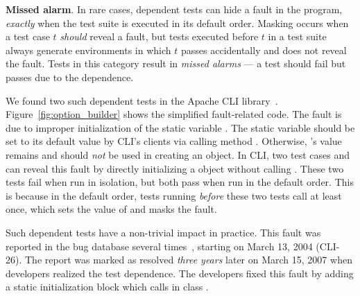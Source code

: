 \vspace{1mm}

\noindent \textbf{Missed alarm}. In rare cases,
dependent tests can hide a fault in the
program, \emph{exactly} when the test suite is executed in its default
order. Masking occurs when a test case $t$ \emph{should}
reveal a fault, but tests executed before $t$ in a test suite always
generate environments in which $t$ passes accidentally and
does not reveal the fault. 
Tests in this category result in \textit{missed alarms} ---
a test should fail but passes due to the dependence.




We found two such dependent tests in
the Apache CLI library~\cite{cli, DBLP:conf/sigsoft/MusluSW11}.
Figure~\ref{fig:option_builder} shows the simplified fault-related
code. The fault is due to improper initialization of the static variable
. The static variable  should be set
to its default value  by CLI's clients via calling
method . Otherwise, 's
value remains  and should \emph{not} be
used in creating an  object.
In CLI, two test cases 
 and 
can reveal this fault by directly initializing
a  object without calling .
These two tests fail when run in isolation,
but both pass when run in the default order. This is because
in the default order, tests running \emph{before} these
two tests call  at least once, which sets
the value of  and masks the fault.


Such dependent tests have a non-trivial impact in practice.
This fault was reported in the bug database several times~\cite{clibug},
starting on March 13, 2004 (CLI-26). The report was marked as resolved
\emph{three years} later on March 15, 2007 when developers
realized the test dependence. The developers fixed this
fault by adding a static initialization block which
calls  in class .

